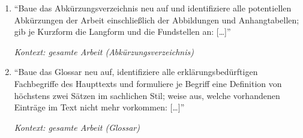 \begin{enumerate}
    \item \enquote{Baue das Abkürzungsverzeichnis neu auf und identifiziere
            alle potentiellen Abkürzungen der Arbeit einschließlich der
            Abbildungen und Anhangtabellen; gib je Kurzform die Langform und
            die Fundstellen an: [\dots]}
            \par\hfill\textit{Kontext: gesamte Arbeit
            (Abkürzungsverzeichnis)}

    \item \enquote{Baue das Glossar neu auf, identifiziere alle
            erklärungsbedürftigen Fachbegriffe des Haupttexts und formuliere
            je Begriff eine Definition von höchstens zwei Sätzen im sachlichen
            Stil; weise aus, welche vorhandenen Einträge im Text nicht mehr
            vorkommen: [\dots]}
            \par\hfill\textit{Kontext: gesamte Arbeit (Glossar)}
\end{enumerate}

